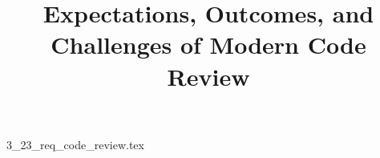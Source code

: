 \documentclass{article}      %
\title{Expectations, Outcomes, and Challenges of Modern Code Review}  %
\begin{document}

\maketitle                   %



{3_23_req_code_review.tex}
\printbibliography
\end{document}
